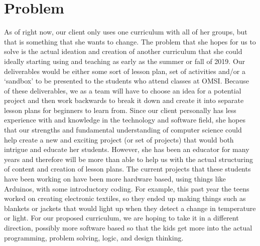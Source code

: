 \documentclass{article}
\begin{document}
\section{Problem}
As of right now, our client only uses one curriculum with all of her groups, but that is something that she wants to change. The problem that she hopes for us to solve is the actual ideation and creation of another curriculum that she could ideally starting using and teaching as early as the summer or fall of 2019. Our deliverables would be either some sort of lesson plan, set of activities and/or a ‘sandbox’ to be presented to the students who attend classes at OMSI. Because of these deliverables, we as a team will have to choose an idea for a potential project and then work backwards to break it down and create it into separate lesson plans for beginners to learn from. Since our client personally has less experience with and knowledge in the technology and software field, she hopes that our strengths and fundamental understanding of computer science could help create a new and exciting project (or set of projects) that would both intrigue and educate her students. However, she has been an educator for many years and therefore will be more than able to help us with the actual structuring of content and creation of lesson plans. The current projects that these students have been working on have been more hardware based, using things like Arduinos, with some introductory coding. For example, this past year the teens worked on creating electronic textiles, so they ended up making things such as blankets or jackets that would light up when they detect a change in temperature or light. For our proposed curriculum, we are hoping to take it in a different direction, possibly more software based so that the kids get more into the actual programming, problem solving, logic, and design thinking.
\end{document}
